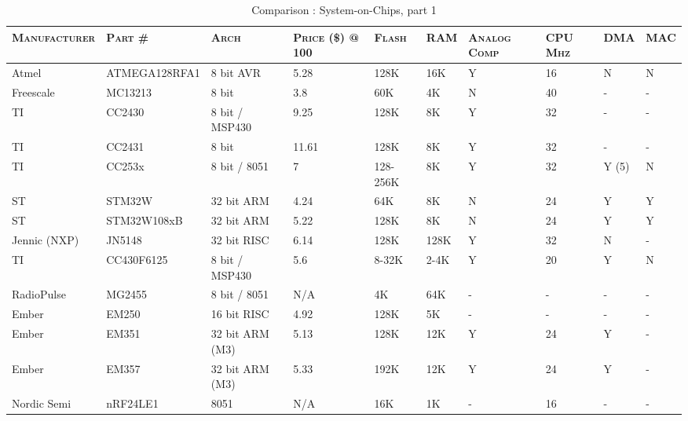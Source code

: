    \begin{sidewaystable}[h]
     \centering
     \begin{tabularx}{0.9\textwidth}{l l l p{1.5cm} l l  p{1.3cm} p{1.3cm} l l}
      \textsc{Manufacturer}
      & \textsc{Part \#}
      & \textsc{Arch}
      & \textsc{Price (\$) @ 100}
      & \textsc{Flash}
      & \textsc{RAM}
      & \textsc{Analog Comp}
      & \textsc{CPU Mhz}
      & \textsc{DMA}
      & \textsc{MAC}
 \\ \hline
        Atmel        & ATMEGA128RFA1 & 8 bit AVR       & 5.28    & 128K     & 16K  & Y &  16      & N     & N   \\ 
        Freescale    & MC13213       & 8 bit           & 3.8     & 60K      & 4K   & N &  40      & -     & -   \\ 
        TI           & CC2430        & 8 bit / MSP430  & 9.25    & 128K     & 8K   & Y &  32      & -     & -   \\ 
        TI           & CC2431        & 8 bit           & 11.61   & 128K     & 8K   & Y &  32      & -     & -   \\ 
        TI           & CC253x        & 8 bit / 8051    & 7       & 128-256K & 8K   & Y &  32      & Y (5) & N   \\ 
        ST           & STM32W        & 32 bit ARM      & 4.24    & 64K      & 8K   & N &  24      & Y     & Y   \\ 
        ST           & STM32W108xB   & 32 bit ARM      & 5.22    & 128K     & 8K   & N &  24      & Y     & Y   \\ 
        Jennic (NXP) & JN5148        & 32 bit RISC     & 6.14    & 128K     & 128K & Y &  32      & N     & -   \\ 
        TI           & CC430F6125    & 8 bit / MSP430  & 5.6     & 8-32K    & 2-4K & Y &  20      & Y     & N   \\ 
        RadioPulse   & MG2455        & 8 bit / 8051    & N/A     & 4K       & 64K  & - &  -       & -     & -   \\ 
        Ember        & EM250         & 16 bit RISC     & 4.92    & 128K     & 5K   & - &  -       & -     & -   \\ 
        Ember        & EM351         & 32 bit ARM (M3) & 5.13    & 128K     & 12K  & Y &  24      & Y     & -   \\ 
        Ember        & EM357         & 32 bit ARM (M3) & 5.33    & 192K     & 12K  & Y &  24      & Y     & -   \\ 
        Nordic Semi  & nRF24LE1      & 8051            & N/A     & 16K      & 1K   & - &  16      & -     & -   \\

     \end{tabularx}
     \caption{Comparison : System-on-Chips, part 1}
     \label{tab:soc-comparison}
   \end{sidewaystable}


